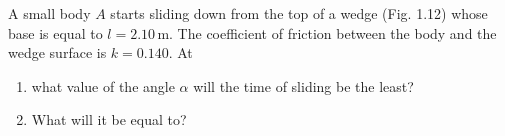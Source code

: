 \item A small body \( A \) starts sliding down from the top of a wedge (Fig. 1.12) whose base is equal to \( l = 2.10 \, \text{m} \). The coefficient of friction between the body and the wedge surface is \( k = 0.140 \). At 
    \begin{center}
    \end{center}
    \begin{enumerate}
        \item what value of the angle \( \alpha \) will the time of sliding be the least?
        \item What will it be equal to?
    \end{enumerate}
